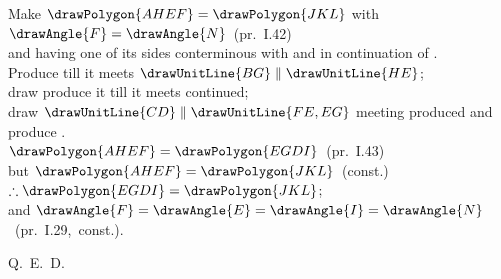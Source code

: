 \documentclass[12pt]{article}\usepackage{geometry}\geometry{a5paper,margin=1.5cm}
\begin{document}
\begin{center}
Make $\drawPolygon{AHEF}=\drawPolygon{JKL}$ with $\drawAngle{F}=\drawAngle{N}$~(pr.~I.42)\\
and having one of its sides  conterminous with
and in continuation of .\\[4pt]
Produce  till it meets $\drawUnitLine{BG}\parallel\drawUnitLine{HE}$;\\
draw  produce it till it meets  continued;\\
draw $\drawUnitLine{CD}\parallel\drawUnitLine{FE,EG}$ meeting 
produced and produce .\\[4pt]
$\drawPolygon{AHEF}=\drawPolygon{EGDI}$~(pr.~I.43)\\
but $\drawPolygon{AHEF}=\drawPolygon{JKL}$~(const.)\\[4pt]
$\therefore \drawPolygon{EGDI}=\drawPolygon{JKL}$;\\[4pt]
and $\drawAngle{F}=\drawAngle{E}=\drawAngle{I}=\drawAngle{N}$~(pr.~I.29,~const.).
\end{center}
\begin{flushright}Q.\ E.\ D.\end{flushright}
\end{document}
